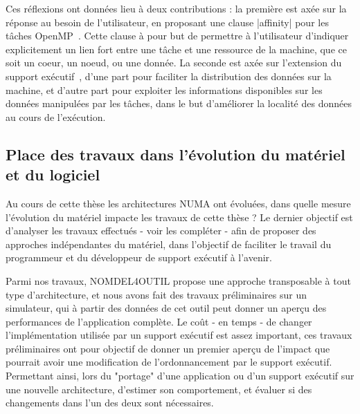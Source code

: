 Ces réflexions ont données lieu à deux contributions : la première est axée sur la réponse au besoin de l'utilisateur, en proposant une clause |affinity| pour les tâches OpenMP~\cite{Virouleau2016b}. Cette clause à pour but de permettre à l'utilisateur d'indiquer explicitement un lien fort entre une tâche et une ressource de la machine, que ce soit un coeur, un noeud, ou une donnée.
La seconde est axée sur l'extension du support exécutif~\cite{Virouleau2016a}, d'une part pour faciliter la distribution des données sur la machine, et d'autre part pour exploiter les informations disponibles sur les données manipulées par les tâches, dans le but d'améliorer la localité des données au cours de l'exécution.


\subsection{Place des travaux dans l'évolution du matériel et du logiciel}

Au cours de cette thèse les architectures NUMA ont évoluées, dans quelle mesure l'évolution du matériel impacte les travaux de cette thèse ?
Le dernier objectif est d'analyser les travaux effectués - voir les compléter - afin de proposer des approches indépendantes du matériel, dans l'objectif de faciliter le travail du programmeur et du développeur de support exécutif à l'avenir.

Parmi nos travaux, NOMDEL4OUTIL propose une approche transposable à tout type d'architecture, et nous avons fait des travaux préliminaires sur un simulateur, qui à partir des données de cet outil peut donner un aperçu des performances de l'application complète.
Le coût - en temps - de changer l'implémentation utilisée par un support exécutif est assez important, ces travaux préliminaires ont pour objectif de donner un premier aperçu de l'impact que pourrait avoir une modification de l'ordonnancement par le support exécutif.
Permettant ainsi, lors du "portage" d'une application ou d'un support exécutif sur une nouvelle architecture, d'estimer son comportement, et évaluer si des changements dans l'un des deux sont nécessaires.
